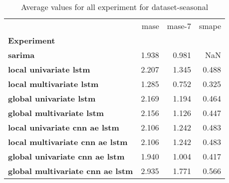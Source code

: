 \begin{table}[h]
\centering
\caption{Average values for all experiment for dataset-seasonal}
\label{table:Average-metric-dataset-seasonal}
\begin{tabular}{lrrr}
\toprule
{} &   mase &  mase-7 &  smape \\
\textbf{Experiment                     } &        &         &        \\
\midrule
\textbf{sarima                         } &  1.938 &   0.981 &    NaN \\
\textbf{local univariate lstm          } &  2.207 &   1.345 &  0.488 \\
\textbf{local multivariate lstm        } &  1.285 &   0.752 &  0.325 \\
\textbf{global univariate lstm         } &  2.169 &   1.194 &  0.464 \\
\textbf{global multivariate lstm       } &  2.156 &   1.126 &  0.447 \\
\textbf{local univariate cnn ae lstm   } &  2.106 &   1.242 &  0.483 \\
\textbf{local multivariate cnn ae lstm } &  2.106 &   1.242 &  0.483 \\
\textbf{global univariate cnn ae lstm  } &  1.940 &   1.004 &  0.417 \\
\textbf{global multivariate cnn ae lstm} &  2.935 &   1.771 &  0.566 \\
\bottomrule
\end{tabular}
\end{table}
